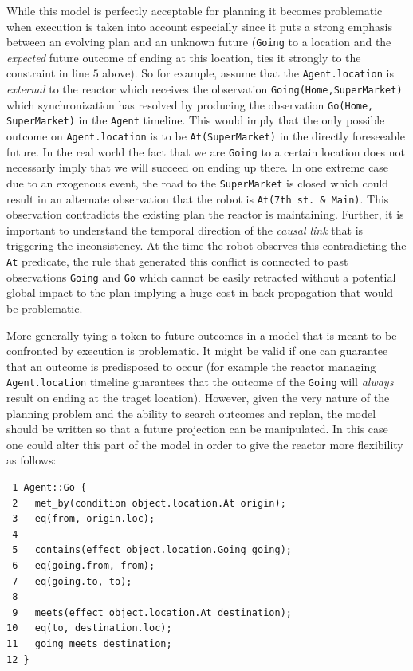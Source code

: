 While this model is perfectly acceptable for planning it becomes
problematic when execution is taken into account especially since it
puts a strong emphasis between an evolving plan and an unknown future
(\texttt{Going} to a location and the {\em expected} future outcome of
ending at this location, ties it strongly to the constraint in line
$5$ above).  So for example, assume that the \texttt{Agent.location}
is {\em external} to the reactor which receives the observation
\texttt{Going(Home,SuperMarket)} which synchronization has resolved by
producing the observation \texttt{Go(Home, SuperMarket)} in the
\texttt{Agent} timeline. This would imply that the only possible
outcome on \texttt{Agent.location} is to be \texttt{At(SuperMarket)}
in the directly foreseeable future. In the real world the fact that we
are \texttt{Going} to a certain location does not necessarly imply
that we will succeed on ending up there. In one extreme case due to an
exogenous event, the road to the \texttt{SuperMarket} is closed which
could result in an alternate observation that the robot is
\texttt{At(7th st. \& Main)}. This observation contradicts the
existing plan the reactor is maintaining. Further, it is important to
understand the temporal direction of the \emph{causal link} that is
triggering the inconsistency. At the time the robot observes this
contradicting the \texttt{At} predicate, the rule that generated this
conflict is connected to past observations \texttt{Going} and
\texttt{Go} which cannot be easily retracted without a potential
global impact to the plan implying a huge cost in back-propagation
that would be problematic.

More generally tying a token to future outcomes in a model that is
meant to be confronted by execution is problematic. It might be valid
if one can guarantee that an outcome is predisposed to occur (for
example the reactor managing \texttt{Agent.location} timeline
guarantees that the outcome of the \texttt{Going} will {\em always}
result on ending at the traget location). However, given the very
nature of the planning problem and the ability to search outcomes and
replan, the model should be written so that a future projection can be
manipulated. %
In this case one could alter this part of the model in order to give
the reactor more flexibility as follows:

\begin{verbatim}
 1 Agent::Go {
 2   met_by(condition object.location.At origin);
 3   eq(from, origin.loc);
 4
 5   contains(effect object.location.Going going);
 6   eq(going.from, from);
 7   eq(going.to, to);
 8   
 9   meets(effect object.location.At destination);
10   eq(to, destination.loc);
11   going meets destination;
12 }
\end{verbatim}

